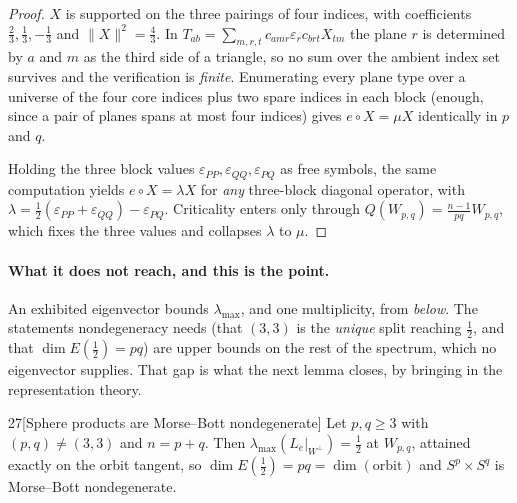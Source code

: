\begin{proof}
$X$ is supported on the three pairings of four indices, with coefficients $\tfrac23,\tfrac13,-\tfrac13$ and $\|X\|^2=\tfrac43$. In $T_{ab}=\sum_{m,r,t}c_{amr}\varepsilon_rc_{brt}X_{tm}$ the plane $r$ is determined by $a$ and $m$ as the third side of a triangle, so no sum over the ambient index set survives and the verification is \emph{finite}. Enumerating every plane type over a universe of the four core indices plus two spare indices in each block (enough, since a pair of planes spans at most four indices) gives $e\circ X=\mu X$ identically in $p$ and $q$.

Holding the three block values $\varepsilon_{PP},\varepsilon_{QQ},\varepsilon_{PQ}$ as free symbols, the same computation yields $e\circ X=\lambda X$ for \emph{any} three-block diagonal operator, with $\lambda=\tfrac12(\varepsilon_{PP}+\varepsilon_{QQ})-\varepsilon_{PQ}$. Criticality enters only through $Q(W_{p,q})=\tfrac{n-1}{pq}W_{p,q}$, which fixes the three values and collapses $\lambda$ to $\mu$.
\end{proof}

\paragraph{What it does not reach, and this is the point.} An exhibited eigenvector bounds $\lambda_{\max}$, and one multiplicity, from \emph{below}. The statements nondegeneracy needs (that $(3,3)$ is the \emph{unique} split reaching $\tfrac12$, and that $\dim E(\tfrac12)=pq$) are upper bounds on the rest of the spectrum, which no eigenvector supplies. That gap is what the next lemma closes, by bringing in the representation theory.

\begin{Lem}{27}[Sphere products are Morse--Bott nondegenerate]
Let $p,q\ge3$ with $(p,q)\ne(3,3)$ and $n=p+q$. Then $\lambda_{\max}(L_e|_{W^\perp})=\tfrac12$ at $W_{p,q}$, attained exactly on the orbit tangent, so $\dim E(\tfrac12)=pq=\dim(\text{orbit})$ and $S^p\times S^q$ is Morse--Bott nondegenerate.
\end{Lem}

